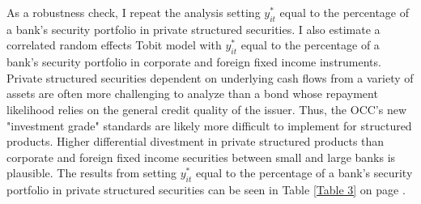 \documentclass[preprint,12pt]{elsarticle}
\begin{document}
As a robustness check, I repeat the analysis setting $y_{it}^{*}$ equal to the percentage of a bank's security portfolio in private structured securities.  I also estimate a correlated random effects Tobit model with $y_{it}^{*}$ equal to the percentage of a bank's security portfolio in corporate and foreign fixed income instruments.  Private structured securities dependent on underlying cash flows from a variety of assets are often more challenging to analyze than a bond whose repayment likelihood relies on the general credit quality of the issuer.  Thus, the OCC's new "investment grade" standards are likely more difficult to implement for structured products.  Higher differential divestment in private structured products than corporate and foreign fixed income securities between small and large banks is plausible.  The results from setting $y_{it}^{*}$ equal to the percentage of a bank's security portfolio in private structured securities can be seen in Table \ref{Table 3} on page \pageref{Table 3}. 
\end{document}
